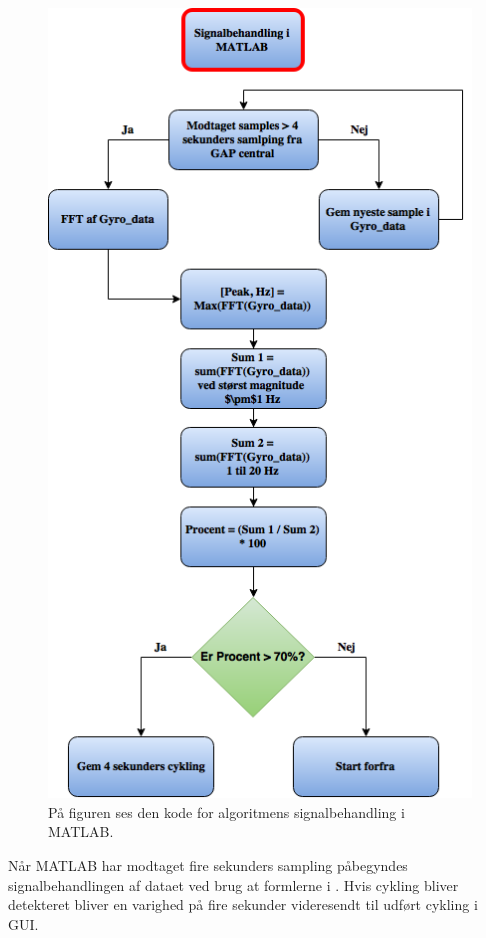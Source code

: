 \begin{figure}[H]
	\centering
	\includegraphics[scale=0.4]{figures/cDesign/algoritme_matlab_cykling.png}
	\caption{På figuren ses den kode for algoritmens signalbehandling i MATLAB.}
	\label{fig:matlab_cykling}
\end{figure} 
Når MATLAB har modtaget fire sekunders sampling påbegyndes signalbehandlingen af dataet ved brug at formlerne i . Hvis cykling bliver detekteret bliver en varighed på fire sekunder videresendt til udført cykling i GUI. 


